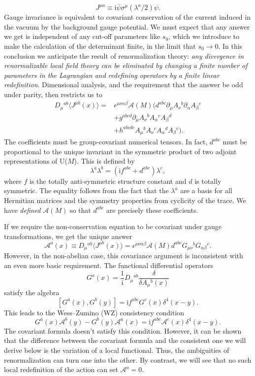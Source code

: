 \[
  J^{\mu a}\equiv\mathrm{i}\bar\psi\sigma^\mu(\lambda^a/2)\psi .
\]
Gauge invariance is equivalent to covariant conservation of the current
induced in the vacuum by the background gauge potential. We must expect that
any answer we get is independent of any cut-off parameters like $s_0$, which
we introduce to make the calculation of the determinant finite, in the limit
that $s_0\to0$. In this conclusion we anticipate the result of
renormalization theory: \emph{any divergence in renormalizable local field
theory can be eliminated by changing a finite number of parameters in the
Lagrangian and redefining operators by a finite linear redefinition}.
Dimensional analysis, and the requirement that the answer be odd under parity,
then restricts us to
\[
\begin{aligned}
  D_\mu{}^{ab}\langle J^{\mu b}(x)\rangle
  ={}&\epsilon^{\mu\nu\alpha\beta}\mathcal A(M)
  \bigl(d^{abc}\partial_\mu A_\nu{}^b\partial_\alpha A_\beta{}^c\\
  &+g^{abcd}\partial_\mu A_\nu{}^b A_\alpha{}^c A_\beta{}^d\\
  &+h^{abcde}A_\mu{}^b A_\nu{}^c A_\alpha{}^d A_\beta{}^e\bigr).
\end{aligned}
\]
The coefficients must be group-covariant numerical tensors. In fact,
$d^{abc}$ must be proportional to the unique invariant in the symmetric
product of two adjoint representations of U($M$). This is defined by
\[
  \lambda^a\lambda^b=(\mathrm{i}f^{abc}+d^{abc})\lambda^c,
\]
where $f$ is the totally anti-symmetric structure constant and $d$ is
totally symmetric. The equality follows from the fact that the $\lambda^a$
are a basis for all Hermitian matrices and the symmetry properties from
cyclicity of the trace. We have \emph{defined} $\mathcal A(M)$ so that
$d^{abc}$ are precisely these coefficients.

If we require the non-conservation equation to be covariant under gauge
transformations, we get the unique answer
\[
  \mathcal A^a(x)\equiv D_\mu{}^{ab}\langle J^{\mu b}(x)\rangle
  =\epsilon^{\mu\nu\alpha\beta}\mathcal A(M)d^{abc}
    G_{\mu\nu}{}^bG_{\alpha\beta}{}^c .
\]
However, in the non-abelian case, this covariance argument is inconsistent
with an even more basic requirement. The functional differential operators
\[
  G^a(x)=\frac{1}{\mathrm{i}}D_\mu{}^{ab}
    \frac{\delta}{\delta A_\mu{}^b(x)}
\]
satisfy the algebra
\[
  [G^a(x),G^b(y)]=\mathrm{i}f^{abc}G^c(x)\delta^4(x-y).
\]
This leads to the Wess--Zumino (WZ) consistency condition \cite{banks-ref-106}
\[
  G^a(x)\mathcal A^b(y)-G^b(y)\mathcal A^a(x)
  =\mathrm{i}f^{abc}\mathcal A^c(x)\delta^4(x-y).
\]
The covariant formula doesn't satisfy this condition. However, it can be shown
that the difference between the covariant formula and the consistent one we
will derive below is the variation of a local functional. Thus, the
ambiguities of renormalization can turn one into the other. By contrast, we
will see that no such local redefinition of the action can set $\mathcal A^a=0$.


